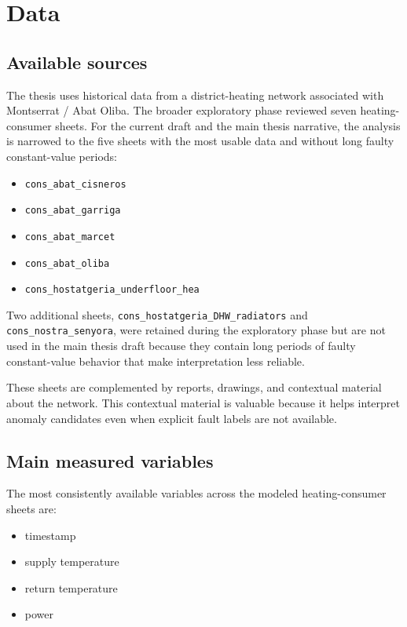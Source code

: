 \section{Data}

\subsection{Available sources}

The thesis uses historical data from a district-heating network associated with Montserrat / Abat Oliba. The broader exploratory phase reviewed seven heating-consumer sheets. For the current draft and the main thesis narrative, the analysis is narrowed to the five sheets with the most usable data and without long faulty constant-value periods:

\begin{itemize}
\item \texttt{cons\_abat\_cisneros}
\item \texttt{cons\_abat\_garriga}
\item \texttt{cons\_abat\_marcet}
\item \texttt{cons\_abat\_oliba}
\item \texttt{cons\_hostatgeria\_underfloor\_hea}
\end{itemize}

Two additional sheets, \texttt{cons\_hostatgeria\_DHW\_radiators} and \texttt{cons\_nostra\_senyora}, were retained during the exploratory phase but are not used in the main thesis draft because they contain long periods of faulty constant-value behavior that make interpretation less reliable.

These sheets are complemented by reports, drawings, and contextual material about the network. This contextual material is valuable because it helps interpret anomaly candidates even when explicit fault labels are not available.

\subsection{Main measured variables}

The most consistently available variables across the modeled heating-consumer sheets are:

\begin{itemize}
\item timestamp
\item supply temperature
\item return temperature
\item power
\end{itemize}

